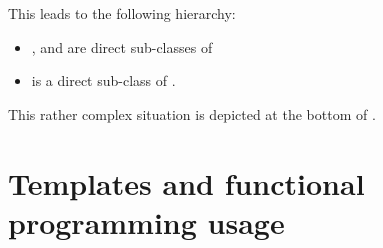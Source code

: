 This leads to the following hierarchy:
\begin{itemize}
\item {},  and  are direct sub-classes of 

\item {} is a direct sub-class   of .
\end{itemize}

This rather complex situation is depicted at the bottom of .


\section{Templates and functional programming usage}

